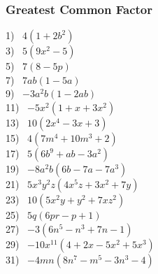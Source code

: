 \documentclass[11pt]{book}
\newcommand{\tmstrong}[1]{\textbf{#1}}
\theoremstyle{definition}  %
\begin{document}
\subsubsection{Greatest Common Factor}


\begin{multicols}{2}
  1)~ $4(1+2b^2)$\\
  3)~ $5(9x^2-5)$\\
  5)~ $7(8-5p)$\\
  7)~ $7ab(1-5a)$\\
  9)~ $-3a^2b(1-2ab)$\\
  11)~ $-5x^2(1+x+3x^2)$\\
  13)~ $10(2x^4-3x+3)$\\
  15)~ $4(7m^4+10m^3+2)$\\
  17)~ $5(6b^9+ab-3a^2)$\\
  19)~ $-8a^2b(6b-7a-7a^3)$\\
  21)~ $5x^3y^2z(4x^5z+3x^2+7y)$\\
  23)~ $10(5x^2y+y^2+7xz^2)$\\
  25)~ $5q(6pr-p+1)$\\
  27)~ $-3(6n^5-n^3+7n-1)$\\
  29)~ $-10x^{11}(4+2x-5x^2+5x^3)$\\
  31)~ $-4mn(8n^7-m^5-3n^3-4)$%
\end{multicols}
\end{document}
